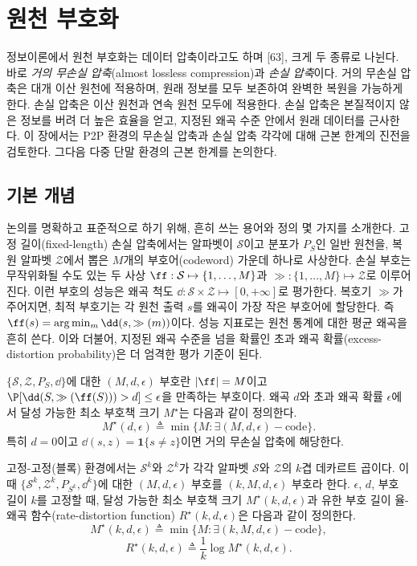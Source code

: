 \section{원천 부호화}

정보이론에서 원천 부호화는 데이터 압축이라고도 하며 [63], 크게 두 종류로 나뉜다. 바로 \emph{거의 무손실 압축}(almost lossless compression)과 \emph{손실 압축}이다. 거의 무손실 압축은 대개 이산 원천에 적용하며, 원래 정보를 모두 보존하여 완벽한 복원을 가능하게 한다. 손실 압축은 이산 원천과 연속 원천 모두에 적용한다. 손실 압축은 본질적이지 않은 정보를 버려 더 높은 효율을 얻고, 지정된 왜곡 수준 안에서 원래 데이터를 근사한다. 이 장에서는 P2P 환경의 무손실 압축과 손실 압축 각각에 대해 근본 한계의 진전을 검토한다. 그다음 다중 단말 환경의 근본 한계를 논의한다.

\subsection{기본 개념}

논의를 명확하고 표준적으로 하기 위해, 흔히 쓰는 용어와 정의 몇 가지를 소개한다. 고정 길이(fixed-length) 손실 압축에서는 알파벳이 $\mathcal{S}$이고 분포가 $P_S$인 일반 원천을, 복원 알파벳 $\mathcal{Z}$에서 뽑은 $M$개의 부호어(codeword) 가운데 하나로 사상한다. 손실 부호는 무작위화될 수도 있는 두 사상 $\ff:\mathcal{S}\mapsto\{1,\dots,M\}$과 $\gg:\{1,\dots,M\}\mapsto\mathcal{Z}$로 이루어진다. 이런 부호의 성능은 왜곡 척도 $\dd:\mathcal{S}\times\mathcal{Z}\mapsto[0,+\infty]$로 평가한다. 복호기 $\gg$가 주어지면, 최적 부호기는 각 원천 출력 $s$를 왜곡이 가장 작은 부호어에 할당한다. 즉 $\ff(s)=\arg\min_m \dd(s,\gg(m))$이다. 성능 지표로는 원천 통계에 대한 평균 왜곡을 흔히 쓴다. 이와 더불어, 지정된 왜곡 수준을 넘을 확률인 초과 왜곡 확률(excess-distortion probability)은 더 엄격한 평가 기준이 된다.

$\{\mathcal{S},\mathcal{Z},P_S,\dd\}$에 대한 $(M,d,\epsilon)$ 부호란 $|\ff|=M$이고 $\P[\dd(S,\gg(\ff(S)))>d]\le\epsilon$을 만족하는 부호이다. 왜곡 $d$와 초과 왜곡 확률 $\epsilon$에서 달성 가능한 최소 부호책 크기 $M^\star$는 다음과 같이 정의한다.
\begin{equation}
M^\star(d,\epsilon)\triangleq\min\{M:\exists(M,d,\epsilon)-\text{code}\}. \tag{1}
\end{equation}
특히 $d=0$이고 $\dd(s,z)=\mathbf{1}\{s\neq z\}$이면 거의 무손실 압축에 해당한다.

고정-고정(블록) 환경에서는 $\mathcal{S}^k$와 $\mathcal{Z}^k$가 각각 알파벳 $\mathcal{S}$와 $\mathcal{Z}$의 $k$겹 데카르트 곱이다. 이때 $\{\mathcal{S}^k,\mathcal{Z}^k,P_{S^k},\dd^k\}$에 대한 $(M,d,\epsilon)$ 부호를 $(k,M,d,\epsilon)$ 부호라 한다. $\epsilon$, $d$, 부호 길이 $k$를 고정할 때, 달성 가능한 최소 부호책 크기 $M^\star(k,d,\epsilon)$과 유한 부호 길이 율-왜곡 함수(rate-distortion function) $R^\star(k,d,\epsilon)$은 다음과 같이 정의한다.
\begin{equation}
M^\star(k,d,\epsilon)\triangleq\min\{M:\exists(k,M,d,\epsilon)-\text{code}\}, \tag{2}
\end{equation}
\begin{equation}
R^\star(k,d,\epsilon)\triangleq\frac{1}{k}\log M^\star(k,d,\epsilon). \tag{3}
\end{equation}


